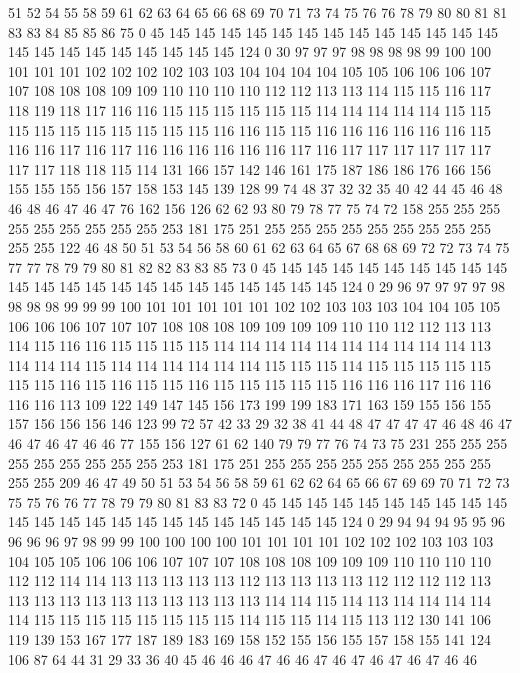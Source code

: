 51 52 54 55 58 59 61 62 63 64 65 66 68 69 70 71 73 74 75 76
76 78 79 80 80 81 81 83 83 84 85 85 86 75 0 45 145 145 145 145
145 145 145 145 145 145 145 145 145 145 145 145 145 145 145 145 145 145 124 0
30 97 97 97 98 98 98 98 99 100 100 101 101 101 102 102 102 102 103 103
104 104 104 104 105 105 106 106 106 107 107 108 108 108 109 109 110 110 110 110
112 112 113 113 114 115 115 116 117 118 119 118 117 116 116 115 115 115 115 115
115 114 114 114 114 114 115 115 115 115 115 115 115 115 115 115 116 116 115 115
116 116 116 116 116 116 115 116 116 117 116 117 116 116 116 116 116 116 117 116
117 117 117 117 117 117 117 117 118 118 115 114 131 166 157 142 146 161 175 187
186 186 176 166 156 155 155 155 156 157 158 153 145 139 128 99 74 48 37 32
32 35 40 42 44 45 46 48 46 48 46 47 46 47 76 162 156 126 62 62
93 80 79 78 77 75 74 72 158 255 255 255 255 255 255 255 255 255 253 181
175 251 255 255 255 255 255 255 255 255 255 255 255 122 46 48 50 51 53 54
56 58 60 61 62 63 64 65 67 68 68 69 72 72 73 74 75 77 77 78
79 79 80 81 82 82 83 83 85 73 0 45 145 145 145 145 145 145 145 145
145 145 145 145 145 145 145 145 145 145 145 145 145 145 124 0 29 96 97 97
97 97 98 98 98 98 99 99 99 100 101 101 101 101 101 102 102 103 103 103
104 104 105 105 106 106 106 107 107 107 108 108 108 109 109 109 109 110 110 112
112 113 113 114 115 116 116 115 115 115 115 114 114 114 114 114 114 114 114 114
114 113 114 114 114 115 114 114 114 114 114 114 115 115 115 114 115 115 115 115
115 115 115 116 115 116 115 115 116 115 115 115 115 115 116 116 116 117 116 116
116 116 113 109 122 149 147 145 156 173 199 199 183 171 163 159 155 156 155 157
156 156 156 146 123 99 72 57 42 33 29 32 38 41 44 48 47 47 47 47
46 48 46 47 46 47 46 47 46 46 77 155 156 127 61 62 140 79 79 77
76 74 73 75 231 255 255 255 255 255 255 255 255 255 253 181 175 251 255 255
255 255 255 255 255 255 255 255 255 209 46 47 49 50 51 53 54 56 58 59
61 62 62 64 65 66 67 69 69 70 71 72 73 75 75 76 76 77 78 79
79 80 81 83 83 72 0 45 145 145 145 145 145 145 145 145 145 145 145 145
145 145 145 145 145 145 145 145 145 145 124 0 29 94 94 94 95 95 96 96
96 96 97 98 99 99 100 100 100 100 101 101 101 101 102 102 102 103 103 103
104 105 105 106 106 106 107 107 107 108 108 108 109 109 109 110 110 110 110 112
112 114 114 113 113 113 113 113 112 113 113 113 113 112 112 112 112 113 113 113
113 113 113 113 113 113 113 113 114 114 115 114 113 114 114 114 114 114 115 115
115 115 115 115 115 115 114 115 115 114 115 113 112 130 141 106 119 139 153 167
177 187 189 183 169 158 152 155 156 155 157 158 155 141 124 106 87 64 44 31
29 33 36 40 45 46 46 46 47 46 46 47 46 47 46 47 46 47 46 46
